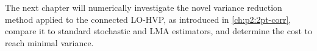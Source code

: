 The next chapter will numerically investigate the novel variance reduction method applied to the connected LO-HVP, as introduced in \cref{ch:p2:2pt-corr}, compare it to standard stochastic and LMA estimators, and determine the cost to reach minimal variance.



